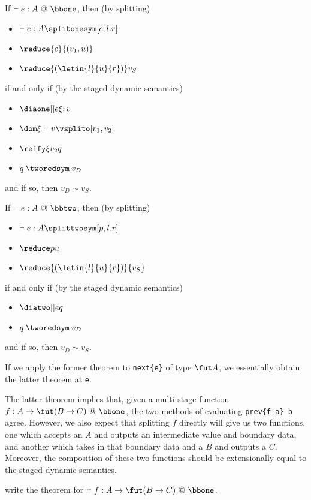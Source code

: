 \begin{theorem}
If $\vdash e:A~@~\bbone$, then (by splitting)
\begin{itemize}
\item $\vdash e : A \splitonesym [c,l.r]$
\item $\reduce {c} {(v_1,u)}$
\item $\reduce {(\letin{l}{u}{r})} v_S$
\end{itemize}
if and only if (by the staged dynamic semantics)
\begin{itemize}
\item $\diaone [] e {\xi;v}$
\item $\dom \xi \vdash v \vsplito [v_1,v_2]$
\item $\reify \xi{v_2}q$
\item $q \mathbin{\tworedsym} v_D$
\end{itemize}
and if so, then $v_D \sim v_S$.
\end{theorem}

\begin{theorem}
If $\vdash e:A~@~\bbtwo$, then (by splitting)
\begin{itemize}
\item $\vdash e : A \splittwosym [p,l.r]$
\item $\reduce p u$
\item $\reduce{(\letin{l}{u}{r})}{v_S}$
\end{itemize}
if and only if (by the staged dynamic semantics)
\begin{itemize}
\item $\diatwo [] e q$
\item $q \mathbin{\tworedsym} v_D$
\end{itemize}
and if so, then $v_D \sim v_S$.
\end{theorem}

If we apply the former theorem to \verb|next{e}| of type $\fut A$, we
essentially obtain the latter theorem at \verb|e|.

The latter theorem implies that, given a multi-stage function $f:A\to\fut(B\to
C)~@~\bbone$, the two methods of evaluating \verb|prev{f a} b| agree.
However, we also expect that splitting $f$ directly will give us two functions,
one which accepts an $A$ and outputs an intermediate value and boundary data,
and another which takes in that boundary data and a $B$ and outputs a $C$.
Moreover, the composition of these two functions should be extensionally equal
to the staged dynamic semantics.

\TODO write the theorem for $\vdash f:A\to\fut(B\to C)~@~\bbone$.


